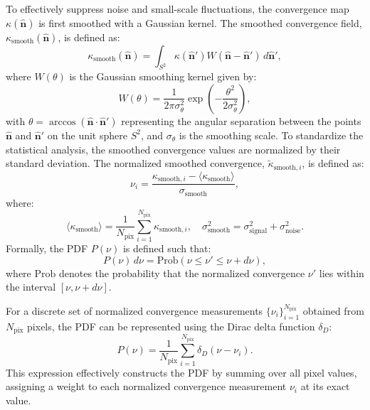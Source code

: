 To effectively suppress noise and small-scale fluctuations, the convergence map $\kappa(\hat{\mathbf{n}})$ is first smoothed with a Gaussian kernel. The smoothed convergence field, $\kappa_{\mathrm{smooth}}(\hat{\mathbf{n}})$, is defined as:
\begin{equation}
    \kappa_{\mathrm{smooth}}(\hat{\mathbf{n}}) = \int_{S^2} \kappa(\hat{\mathbf{n}}') W(\hat{\mathbf{n}} - \hat{\mathbf{n}}') \, d\hat{\mathbf{n}}',
    \label{eq:smoothing}
\end{equation}
where $W(\theta)$ is the Gaussian smoothing kernel given by:
\begin{equation}
    W(\theta) = \frac{1}{2\pi \sigma_{\theta}^2} \exp\left( -\frac{\theta^2}{2 \sigma_{\theta}^2} \right),
    \label{eq:gaussian_kernel}
\end{equation}
with $\theta = \arccos(\hat{\mathbf{n}} \cdot \hat{\mathbf{n}}')$ representing the angular separation between the points $\hat{\mathbf{n}}$ and $\hat{\mathbf{n}}'$ on the unit sphere $S^2$, and $\sigma_{\theta}$ is the smoothing scale. To standardize the statistical analysis, the smoothed convergence values are normalized by their standard deviation. The normalized smoothed convergence, $\tilde{\kappa}_{\mathrm{smooth}, i}$, is defined as:
\begin{equation}
    \nu_{i} = \frac{\kappa_{\mathrm{smooth}, i} - \langle \kappa_{\mathrm{smooth}} \rangle}{\sigma_{\mathrm{smooth}}},
    \label{eq:kappa_smooth_normalized}
\end{equation}
where:
\begin{equation}
    \langle \kappa_{\mathrm{smooth}} \rangle = \frac{1}{N_{\mathrm{pix}}} \sum_{i=1}^{N_{\mathrm{pix}}} \kappa_{\mathrm{smooth}, i}, \quad \sigma_{\mathrm{smooth}}^2 = \sigma_{\mathrm{signal}}^2 + \sigma_{\mathrm{noise}}^2.
    \label{eq:normalization}
\end{equation}
Formally, the PDF \( P(\nu) \) is defined such that:
\begin{equation}
    P(\nu) \, d\nu = \mathrm{Prob}(\nu \leq \nu' \leq \nu + d\nu),
\end{equation}
where \(\mathrm{Prob}\) denotes the probability that the normalized convergence \(\nu'\) lies within the interval \([\nu, \nu + d\nu]\).

For a discrete set of normalized convergence measurements \(\{\nu_i\}_{i=1}^{N_{\mathrm{pix}}}\) obtained from \(N_{\mathrm{pix}}\) pixels, the PDF can be represented using the Dirac delta function \(\delta_D\):
\begin{equation}
    P(\nu) = \frac{1}{N_{\mathrm{pix}}} \sum_{i=1}^{N_{\mathrm{pix}}} \delta_D(\nu - \nu_i).
    \label{eq:pdf_delta}
\end{equation}
This expression effectively constructs the PDF by summing over all pixel values, assigning a weight to each normalized convergence measurement \(\nu_i\) at its exact value.

